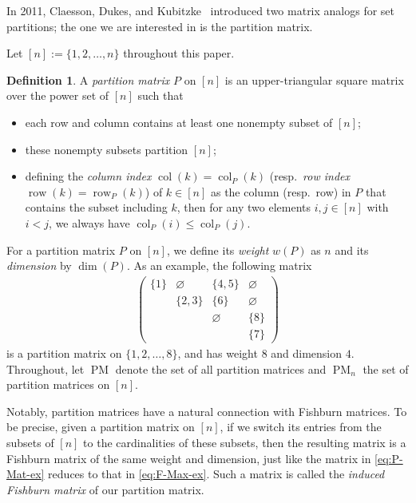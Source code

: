 \documentclass[12pt,reqno]{amsart}
\numberwithin{equation}{section}
\theoremstyle{theorem}
\theoremstyle{definition}
\newtheorem{definition}[theorem]{Definition}
\theoremstyle{named}
\newcommand{\MatP}{\operatorname{PM}}
\newcommand{\col}{\operatorname{col}}
\newcommand{\row}{\operatorname{row}}
\begin{document}
In 2011, Claesson, Dukes, and Kubitzke~\cite{CDK2011} introduced two matrix analogs for set partitions; the one we are interested in is the partition matrix.

Let $[n]:=\{1,2,\ldots,n\}$ throughout this paper.

\begin{definition}\label{def:pm}
	A \emph{partition matrix} $P$ on $[n]$ is an upper-triangular square matrix over the power set of $[n]$ such that
	\begin{itemize}[itemindent=*, leftmargin=*, itemsep=2pt, topsep=2pt, parsep=2pt]
		\item each row and column contains at least one nonempty subset of $[n]$;
		
		\item these nonempty subsets partition $[n]$;
		
		\item defining the \emph{column index} $\col(k)=\col_P(k)$ (resp.~\emph{row index} $\row(k)=\row_P(k)$) of $k\in [n]$ as the column (resp.~row) in $P$ that contains the subset including $k$, then for any two elements $i,j\in [n]$ with $i<j$, we always have $\col_P(i)\le \col_P(j)$.
	\end{itemize}
\end{definition}

For a partition matrix $P$ on $[n]$, we define its \emph{weight} $w(P)$ as $n$ and its \emph{dimension} by $\dim(P)$. As an example, the following matrix
\begin{align}\label{eq:P-Mat-ex}
	\begin{pmatrix}
		\{1\} & \varnothing & \{4,5\} & \varnothing\\
		& \{2,3\} & \{6\} & \varnothing\\
		& & \varnothing & \{8\}\\
		& & & \{7\}
	\end{pmatrix}
\end{align}
is a partition matrix on $\{1,2,\ldots,8\}$, and has weight $8$ and dimension $4$. Throughout, let $\MatP$ denote the set of all partition matrices and $\MatP_{n}$ the set of partition matrices on $[n]$.

Notably, partition matrices have a natural connection with Fishburn matrices. To be precise, given a partition matrix on $[n]$, if we switch its entries from the subsets of $[n]$ to the cardinalities of these subsets, then the resulting matrix is a Fishburn matrix of the same weight and dimension, just like the matrix in \eqref{eq:P-Mat-ex} reduces to that in \eqref{eq:F-Max-ex}. Such a matrix is called the \emph{induced Fishburn matrix} of our partition matrix.
\end{document}
